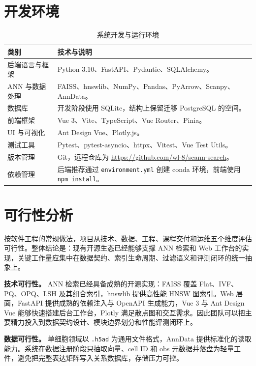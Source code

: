 \documentclass[UTF8,a4paper,12pt]{ctexrep}
\begin{document}
\section{开发环境}

\begin{table}[H]
  \centering
  \caption{系统开发与运行环境}
  \begin{tabularx}{0.95\textwidth}{lY}
    \toprule
    类别 & 技术与说明 \\
    \midrule
    后端语言与框架 & Python 3.10、FastAPI、Pydantic、SQLAlchemy。 \\
    ANN 与数据处理 & FAISS、hnswlib、NumPy、Pandas、PyArrow、Scanpy、AnnData。 \\
    数据库 & 开发阶段使用 SQLite，结构上保留迁移 PostgreSQL 的空间。 \\
    前端框架 & Vue 3、Vite、TypeScript、Vue Router、Pinia。 \\
    UI 与可视化 & Ant Design Vue、Plotly.js。 \\
    测试工具 & Pytest、pytest-asyncio、httpx、Vitest、Vue Test Utils。 \\
    版本管理 & Git，远程仓库为 \url{https://github.com/wl-8/scann-search}。 \\
    依赖管理 & 后端推荐通过 \texttt{environment.yml} 创建 conda 环境，前端使用 \texttt{npm install}。 \\
    \bottomrule
  \end{tabularx}
\end{table}

\section{可行性分析}

按软件工程的常规做法，项目从技术、数据、工程、课程交付和运维五个维度评估可行性。整体结论是：现有开源生态已经能够支撑 ANN 检索和 Web 工作台的实现，关键工作量应集中在数据契约、索引生命周期、过滤语义和评测闭环的统一抽象上。

\textbf{技术可行性。} ANN 检索已经具备成熟的开源实现：FAISS 覆盖 Flat、IVF、PQ、OPQ、LSH 及其组合索引，hnswlib 提供高性能 HNSW 图索引。Web 层面，FastAPI 提供成熟的依赖注入与 OpenAPI 生成能力，Vue 3 与 Ant Design Vue 能够快速搭建后台工作台，Plotly 满足散点图和交互需求。因此团队可以把主要精力投入到数据契约设计、模块边界划分和性能评测闭环上。

\textbf{数据可行性。} 单细胞领域以 \texttt{.h5ad} 为通用文件格式，AnnData 提供标准化的读取能力。系统在数据注册阶段只抽取向量、cell ID 和 obs 元数据并落盘为轻量工件，避免把完整表达矩阵写入关系数据库，存储压力可控。
\end{document}
